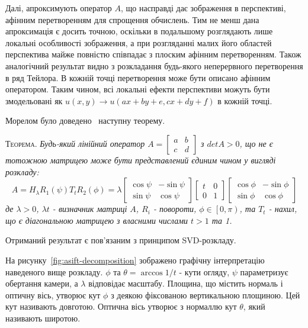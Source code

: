 Далі, апроксимують оператор $A$, що насправді дає зображення в перспективі, афінним перетворенням для спрощення обчислень. Тим не менш дана апроксимація є досить точною, оскільки в подальшому розглядають лише локальні особливості зображення, а при розгляданні малих його областей перспектива майже повністю співпадає з плоским афінним перетворенням. Також аналогічний результат видно з розкладання будь-якого неперервного перетворення в ряд Тейлора. В кожній точці перетворення може бути описано афінним оператором. Таким чином, всі локальні ефекти перспективи можуть бути змодельовані як $u(x,y) \rightarrow u(ax+by+e, cx+dy+f)$ в кожній точці.

Морелом було доведено~\cite{Morel2009} наступну теорему. 

\textsc{Теорема.}
\textit{
Будь-який лінійний оператор 
$A=\begin{bmatrix}a&b \\ c&d\end{bmatrix}$ з $detA > 0$, що не є тотожною матрицею може бути представлений єдиним чином у вигляді розкладу:
  \begin{equation}
    \label{eq:asift-decomposition}
    A = H_\lambda R_1(\psi)T_tR_2(\phi) =     
    \lambda \begin{bmatrix} 
      \cos \psi & -\sin\psi \\
      \sin\psi  & \cos\psi
    \end{bmatrix}
    \begin{bmatrix}
      t & 0 \\
      0 & 1 
    \end{bmatrix}
    \begin{bmatrix} 
      \cos \phi & -\sin\phi \\
      \sin\phi  & \cos\phi
    \end{bmatrix}
  \end{equation}
  де $\lambda>0$, $\lambda t$ - визначник матриці $A$, $R_i$ - повороти, $\phi \in \left[0,\pi\right)$, та $T_t$ - нахил, що є діагональною матрицею з власними числами $t>1$ та 1.
}

Отриманий результат є пов'язаним з принципом SVD-розкладу. 


На рисунку~\ref{fig:asift-decomposition} зображено графічну інтерпретацію наведеного вище розкладу. $\phi$ та $\theta= \arccos1/t$ - кути огляду, $\psi$ параметризує обертання камери, а $\lambda$ відповідає масштабу. Площина, що містить нормаль і оптичну вісь, утворює кут $\phi$ з деякою фіксованою вертикальною площиною. Цей кут називають довготою. Оптична вісь утворює з нормаллю кут $\theta$, який називають широтою. 

